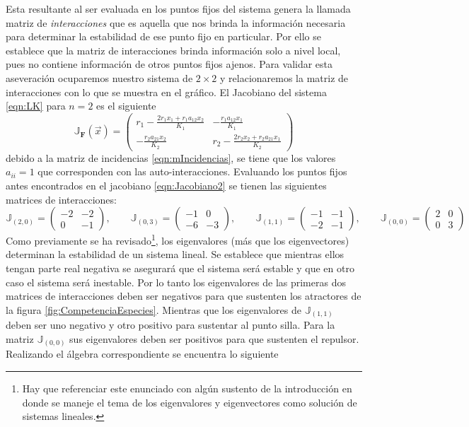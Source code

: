 Esta resultante al ser evaluada en los puntos fijos del sistema genera la llamada matriz de \textit{interacciones} que es aquella que nos brinda la información necesaria para determinar la estabilidad de ese punto fijo en particular. Por ello se establece que la matriz de interacciones brinda información solo a nivel local, pues no contiene información de otros puntos fijos ajenos. Para validar esta aseveración ocuparemos nuestro sistema de $2\times 2$ y relacionaremos la matriz de interacciones con lo que se muestra en el gráfico. El Jacobiano del sistema \ref{eqn:LK} para $n=2$ es el siguiente
\begin{equation}\label{eqn:Jacobiano2}
	\mathbb{J}_\mathbf{F}(\vec{x})=\begin{pmatrix}
		r_1-\frac{2r_1x_1+r_1a_{12}x_2}{K_1} & -\frac{r_1a_{12}x_1}{K_1}\\
		-\frac{r_2a_{21}x_2}{K_2} & r_2-\frac{2r_2x_2+r_2a_{21}x_1}{K_2}
	\end{pmatrix}
\end{equation}
debido a la matriz de incidencias \ref{eqn:mIncidencias}, se tiene que los valores $a_{ii}=1$ que corresponden con las auto-interacciones. Evaluando los puntos fijos antes encontrados en el jacobiano \ref{eqn:Jacobiano2} se tienen las siguientes matrices de interacciones:
$$
\mathbb{J}_{(2,0)} = \begin{pmatrix}
	-2 & -2\\
	0 & -1
\end{pmatrix},\qquad \mathbb{J}_{(0,3)}=\begin{pmatrix}
	-1 & 0\\
	-6 & -3
\end{pmatrix},\qquad \mathbb{J}_{(1,1)}=\begin{pmatrix}
	-1 & -1\\
	-2 & -1
\end{pmatrix},\qquad \mathbb{J}_{(0,0)}=\begin{pmatrix}
	2 & 0 \\
	0 & 3
\end{pmatrix}
$$
Como previamente se ha revisado\footnote{Hay que referenciar este enunciado con algún sustento de la introducción en donde se maneje el tema de los eigenvalores y eigenvectores como solución de sistemas lineales.}, los eigenvalores (más que los eigenvectores) determinan la estabilidad de un sistema lineal. Se establece que mientras ellos tengan parte real negativa se asegurará que el sistema será estable y que en otro caso el sistema será inestable. Por lo tanto los eigenvalores de las primeras dos matrices de interacciones deben ser negativos para que sustenten los atractores de la figura \ref{fig:CompetenciaEspecies}. Mientras que los eigenvalores de $\mathbb{J}_{(1,1)}$ deben ser uno negativo y otro positivo para sustentar al punto silla. Para la matriz $\mathbb{J}_{(0,0)}$ sus eigenvalores deben ser positivos para que sustenten el repulsor. Realizando el álgebra correspondiente se encuentra lo siguiente
